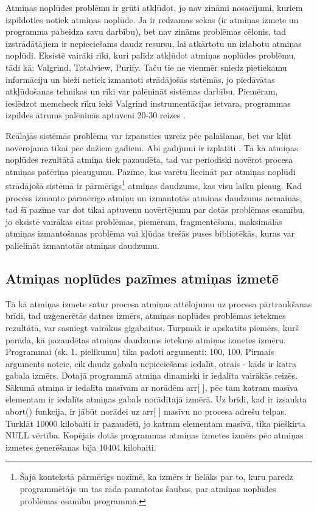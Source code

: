 Atmiņas noplūdes problēmu ir grūti atkļūdot,  jo nav zināmi nosacījumi, kuriem izpildoties notiek atmiņas noplūde. 
Ja ir redzamas sekas (ir atmiņas izmete un programma pabeidza savu darbību), bet nav zināms problēmas cēlonis, tad izstrādātājiem ir nepieciešams daudz resursu, lai atkārtotu un izlabotu atmiņas noplūdi. 
Eksistē vairāki rīki, kuri palīdz atkļūdot atmiņas noplūdes problēmu, tādi kā: Valgrind, Totalview, Purify. 
Taču tie ne vienmēr sniedz pietiekamu informāciju un bieži netiek izmantoti strādājošās sistēmās, jo piedāvātas atkļūdošanas tehnikas un rīki var palēnināt sistēmas darbību.
Piemēram, ieslēdzot  memcheck rīku iekš Valgrind instrumentācijas ietvara, programmas izpildes ātrums palēninās aptuveni 20-30 reizes \cite{UVD}.

Reālajās sistēmās problēma var izpausties uzreiz pēc palaišanas, bet var kļūt novērojama tikai pēc dažiem gadiem. 
Abi gadījumi ir izplatīti \cite{HTTM}.
Tā kā atmiņas noplūdes rezultātā atmiņa tiek pazaudēta, tad var periodiski novērot procesa atmiņas patēriņa pieaugumu.
Pazīme, kas varētu liecināt par atmiņas noplūdi strādājošā sistēmā ir pārmērīgs\footnote{Šajā kontekstā pārmērīgs nozīmē, ka izmērs ir lielāks par to, kuru paredz programmētājs un tas rāda pamatotas šaubas, par atmiņas noplūdes problēmas esamību programmā.}
atmiņas daudzums, kas visu laiku pieaug. 
Kad process izmanto pārmērīgo atmiņu un izmantotās atmiņas daudzums nemainās, tad šī pazīme var dot tikai aptuvenu novērtējumu par dotās problēmas esamību, jo eksistē vairākas citas problēmas, piemēram, fragmentēšana, maksimālās atmiņas izmantošanas problēma vai kļūdas trešās puses bibliotēkās, kuras var palielināt izmantotās atmiņas daudzumu.

\subsection{Atmiņas noplūdes pazīmes atmiņas izmetē}
Tā kā atmiņas izmete satur procesa atmiņas attēlojumu uz procesa pārtraukšanas brīdi, tad uzģenerētās datnes izmērs, atmiņas noplūdes problēmas ietekmes rezultātā, var sasniegt vairākus gigabaitus.
Turpmāk ir apskatīts piemērs, kurš parāda, kā pazaudētas atmiņas daudzums ietekmē atmiņas izmetes izmēru.
Programmai (sk. 1. pielikumu) tika padoti argumenti: 100, 100. 
Pirmais arguments noteic, cik daudz gabalu nepieciešams iedalīt, otrais - kāds ir katra gabala izmērs.
Dotajā programmā atmiņa dinamiski ir iedalīta vairākās reizēs. 
Sākumā atmiņa ir iedalīta masīvam ar norādēm arr[ ], pēc tam katram masīva elementam ir iedalīts atmiņas gabals norādītajā izmērā.
Uz brīdi, kad ir izsaukta abort() funkcija, ir jābūt norādei uz arr[ ] masīvu no procesa adrešu telpas.
Turklāt 10000 kilobaiti ir pazaudēti, jo  katram elementam masīvā, tika piešķirta NULL vērtība. 
Kopējais dotās programmas atmiņas izmetes izmērs pēc atmiņas izmetes ģenerēšanas bija 10404 kilobaiti.

